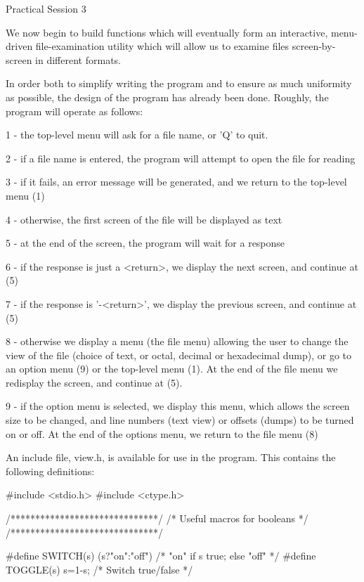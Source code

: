Practical Session 3

We now  begin to  build functions  which will eventually form an interactive,
menu-driven file-examination  utility which  will allow  us to  examine files
screen-by-screen in different formats.

In order  both to  simplify  writing  the  program  and  to  ensure  as  much
uniformity as  possible, the  design of  the program  has already  been done.
Roughly, the program will operate as follows:

1 - the top-level menu will ask for a file name, or 'Q' to quit.

2 -  if a file name is entered, the program will attempt to open the file for
       reading

3 -  if it  fails, an  error message  will be generated, and we return to the
       top-level menu (1)

4 - otherwise, the first screen of the file will be displayed as text

5 - at the end of the screen, the program will wait for a response

6 -  if the  response is  just a  <return>, we  display the  next screen, and
       continue at (5)

7 -  if the  response is  '-<return>', we  display the  previous screen,  and
       continue at (5)

8 -  otherwise we  display a menu (the file menu) allowing the user to change
       the view of the file (choice of text, or octal, decimal or hexadecimal
       dump), or  go to  an option menu (9) or the top-level menu (1). At the
       end of the file menu we redisplay the screen, and continue at (5).

9 -  if the  option menu  is selected, we display this menu, which allows the
       screen size  to be  changed, and  line numbers  (text view) or offsets
       (dumps) to  be turned  on or  off. At  the end of the options menu, we
       return to the file menu (8)

An include  file, view.h,  is available for use in the program. This contains
the following definitions:

#include <stdio.h>
#include <ctype.h>

/******************************/
/* Useful macros for booleans */
/******************************/

#define SWITCH(s)   (s?"on":"off") /* "on" if s true; else "off" */
#define TOGGLE(s)   {s=1-s;}       /* Switch true/false          */

